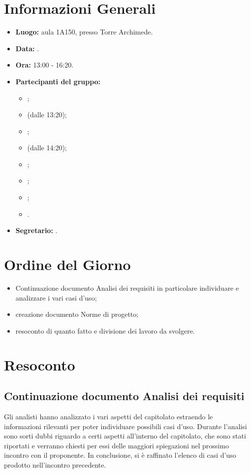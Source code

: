 \section{Informazioni Generali}
\begin{itemize}
\item \textbf{Luogo:} aula 1A150, presso Torre Archimede.
\item \textbf{Data:} \Data.
\item \textbf{Ora:} 13:00 - 16:20.
\item \textbf{Partecipanti del gruppo:}
	\begin{itemize}
		\item \AT; 
		\item \BR (dalle 13:20);
		\item \CE; 
		\item \DF (dalle 14:20);
		\item \LD;
		\item \MC;
		\item \PF;
		\item \SE.
	\end{itemize} 
\item \textbf{Segretario:} \MC.
\end{itemize}


\section{Ordine del Giorno}
\begin{itemize}
	\item Continuazione documento Analisi dei requisiti in particolare individuare e analizzare i vari casi d'uso;
	\item creazione documento Norme di progetto;
	\item resoconto di quanto fatto e divisione dei lavoro da svolgere.
\end{itemize}


\section{Resoconto}
\subsection{Continuazione documento Analisi dei requisiti}
Gli analisti hanno analizzato i vari aspetti del capitolato estraendo le informazioni rilevanti per poter individuare possibili casi d’uso. Durante l’analisi sono sorti dubbi riguardo a certi aspetti all’interno del capitolato, che sono stati riportati e verranno chiesti per essi delle maggiori spiegazioni nel prossimo incontro con il proponente. In conclusione, si è raffinato l’elenco di casi d’uso prodotto nell’incontro precedente.

